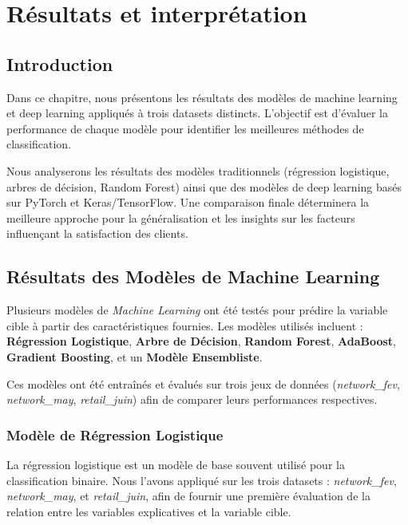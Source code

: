 \chapter{Résultats et interprétation}
\begin{spacing}{1.2}
\minitoc
\thispagestyle{MyStyle}
\end{spacing}
\newpage
\justifying

\section{Introduction}
Dans ce chapitre, nous présentons les résultats des modèles de machine learning et deep learning appliqués à trois datasets distincts. L'objectif est d'évaluer la performance de chaque modèle pour identifier les meilleures méthodes de classification.

Nous analyserons les résultats des modèles traditionnels (régression logistique, arbres de décision, Random Forest) ainsi que des modèles de deep learning basés sur PyTorch et Keras/TensorFlow. Une comparaison finale déterminera la meilleure approche pour la généralisation et les insights sur les facteurs influençant la satisfaction des clients.
\section{Résultats des Modèles de Machine Learning}

Plusieurs modèles de \textit{Machine Learning} ont été testés pour prédire la variable cible à partir des caractéristiques fournies. Les modèles utilisés incluent : \textbf{Régression Logistique}, \textbf{Arbre de Décision}, \textbf{Random Forest}, \textbf{AdaBoost}, \textbf{Gradient Boosting}, et un \textbf{Modèle Ensembliste}.

Ces modèles ont été entraînés et évalués sur trois jeux de données (\textit{network\_fev}, \textit{network\_may}, \textit{retail\_juin}) afin de comparer leurs performances respectives.

\subsection{Modèle de Régression Logistique}

La régression logistique est un modèle de base souvent utilisé pour la classification binaire. Nous l'avons appliqué sur les trois datasets : \textit{network\_fev}, \textit{network\_may}, et \textit{retail\_juin}, afin de fournir une première évaluation de la relation entre les variables explicatives et la variable cible.

